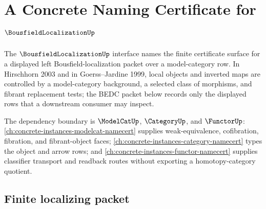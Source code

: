 \chapter{A Concrete Naming Certificate for $\BousfieldLocalizationUp$}
\label{ch:concrete-instances-bousfieldlocalization-namecert}

The $\BousfieldLocalizationUp$ interface names the finite certificate surface for a displayed left Bousfield-localization packet over a model-category row. In Hirschhorn 2003 and in Goerss--Jardine 1999, local objects and inverted maps are controlled by a model-category background, a selected class of morphisms, and fibrant replacement tests; the BEDC packet below records only the displayed rows that a downstream consumer may inspect.

The dependency boundary is $\ModelCatUp$, $\CategoryUp$, and $\FunctorUp$: \autoref{ch:concrete-instances-modelcat-namecert} supplies weak-equivalence, cofibration, fibration, and fibrant-object faces; \autoref{ch:concrete-instances-category-namecert} types the object and arrow rows; and \autoref{ch:concrete-instances-functor-namecert} supplies classifier transport and readback routes without exporting a homotopy-category quotient.

\section{Finite localizing packet}
\label{sec:bousfieldlocalization-finite-localizing-packet}


